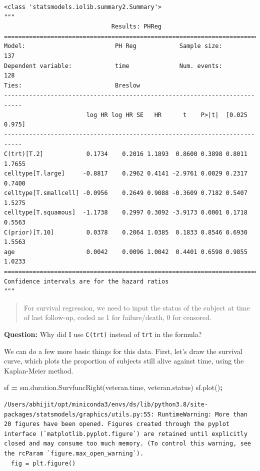 \documentclass[
  letterpaper,
]{scrbook}
\newenvironment{Shaded}{\begin{snugshade}}{\end{snugshade}}
\newcommand{\NormalTok}[1]{#1}
\newcommand{\OperatorTok}[1]{\textcolor[rgb]{0.81,0.36,0.00}{\textbf{#1}}}
\begin{document}
\begin{verbatim}
<class 'statsmodels.iolib.summary2.Summary'>
"""
                              Results: PHReg
===========================================================================
Model:                         PH Reg            Sample size:           137
Dependent variable:            time              Num. events:           128
Ties:                          Breslow                                     
---------------------------------------------------------------------------
                       log HR log HR SE   HR      t    P>|t|  [0.025 0.975]
---------------------------------------------------------------------------
C(trt)[T.2]            0.1734    0.2016 1.1893  0.8600 0.3898 0.8011 1.7655
celltype[T.large]     -0.8817    0.2962 0.4141 -2.9761 0.0029 0.2317 0.7400
celltype[T.smallcell] -0.0956    0.2649 0.9088 -0.3609 0.7182 0.5407 1.5275
celltype[T.squamous]  -1.1738    0.2997 0.3092 -3.9173 0.0001 0.1718 0.5563
C(prior)[T.10]         0.0378    0.2064 1.0385  0.1833 0.8546 0.6930 1.5563
age                    0.0042    0.0096 1.0042  0.4401 0.6598 0.9855 1.0233
===========================================================================
Confidence intervals are for the hazard ratios
"""
\end{verbatim}

\begin{quote}
For survival regression, we need to input the status of the subject
at time of last follow-up, coded as 1 for failure/death, 0 for censored.
\end{quote}

\textbf{Question:} Why did I use \texttt{C(trt)} instead of \texttt{trt} in the formula?

We can do a few more basic things for this data. First, let's draw the
survival curve, which plots the proportion of subjects still alive against time, using the Kaplan-Meier method.

\begin{Shaded}
\begin{Highlighting}[]
\NormalTok{sf }\OperatorTok{=}\NormalTok{ sm.duration.SurvfuncRight(veteran.time, veteran.status)}
\NormalTok{sf.plot()}\OperatorTok{;}
\end{Highlighting}
\end{Shaded}

\begin{verbatim}
/Users/abhijit/opt/miniconda3/envs/ds/lib/python3.8/site-packages/statsmodels/graphics/utils.py:55: RuntimeWarning: More than 20 figures have been opened. Figures created through the pyplot interface (`matplotlib.pyplot.figure`) are retained until explicitly closed and may consume too much memory. (To control this warning, see the rcParam `figure.max_open_warning`).
  fig = plt.figure()
\end{verbatim}
\end{document}
